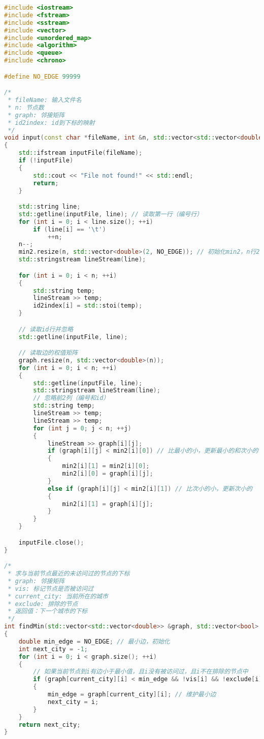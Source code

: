 \documentclass[lang=cn,11pt,a4paper]{elegantpaper}
\begin{document}
\begin{lstlisting}[language=c++]
#include <iostream>
#include <fstream>
#include <sstream>
#include <vector>
#include <unordered_map>
#include <algorithm>
#include <queue>
#include <chrono>

#define NO_EDGE 99999

/*
 * fileName: 输入文件名
 * n: 节点数
 * graph: 邻接矩阵
 * id2index: id到下标的映射
 */
void input(const char *fileName, int &n, std::vector<std::vector<double>> &graph, std::unordered_map<int, int> &id2index, std::vector<std::vector<double>> &min2)
{
    std::ifstream inputFile(fileName);
    if (!inputFile)
    {
        std::cout << "File not found!" << std::endl;
        return;
    }

    std::string line;
    std::getline(inputFile, line); // 读取第一行（编号行）
    for (int i = 0; i < line.size(); ++i)
        if (line[i] == '\t')
            ++n;
    n--;
    min2.resize(n, std::vector<double>(2, NO_EDGE)); // 初始化min2，n行2列，每个元素初始化为NO_EDGE
    std::stringstream lineStream(line);

    for (int i = 0; i < n; ++i)
    {
        std::string temp;
        lineStream >> temp;
        id2index[i] = std::stoi(temp);
    }

    // 读取id行并忽略
    std::getline(inputFile, line);

    // 读取边的权值矩阵
    graph.resize(n, std::vector<double>(n));
    for (int i = 0; i < n; ++i)
    {
        std::getline(inputFile, line);
        std::stringstream lineStream(line);
        // 忽略前2列（编号和id）
        std::string temp;
        lineStream >> temp;
        lineStream >> temp;
        for (int j = 0; j < n; ++j)
        {
            lineStream >> graph[i][j];
            if (graph[i][j] < min2[i][0]) // 比最小的小，更新最小的和次小的
            {
                min2[i][1] = min2[i][0];
                min2[i][0] = graph[i][j];
            }
            else if (graph[i][j] < min2[i][1]) // 比次小的小，更新次小的
            {
                min2[i][1] = graph[i][j];
            }
        }
    }

    inputFile.close();
}

/*
 * 求与当前节点最近的未访问过的节点的下标
 * graph: 邻接矩阵
 * vis: 标记节点是否被访问过
 * current_city: 当前所在的城市
 * exclude: 排除的节点
 * 返回值：下一个城市的下标
 */
int findMin(std::vector<std::vector<double>> &graph, std::vector<bool> &vis, int current_city, std::vector<bool> &exclude)
{
    double min_edge = NO_EDGE; // 最小边，初始化
    int next_city = -1;
    for (int i = 0; i < graph.size(); ++i)
    {
        // 如果当前节点到i有边小于最小值，且i没有被访问过，且i不在排除的节点中
        if (graph[current_city][i] < min_edge && !vis[i] && !exclude[i])
        {
            min_edge = graph[current_city][i]; // 维护最小边
            next_city = i;
        }
    }
    return next_city;
}


\end{lstlisting}
\end{document}
